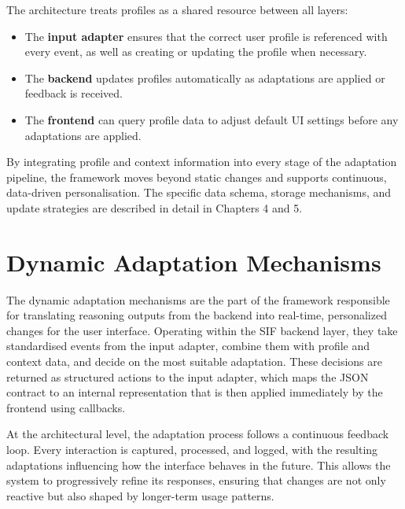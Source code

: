 The architecture treats profiles as a shared resource between all layers:
\begin{itemize}
    \item The \textbf{input adapter} ensures that the correct user profile is referenced with every event, as well as creating or updating the profile when necessary.
    \item The \textbf{backend} updates profiles automatically as adaptations are applied or feedback is received.
    \item The \textbf{frontend} can query profile data to adjust default UI settings before any adaptations are applied.
\end{itemize}
By integrating profile and context information into every stage of the adaptation pipeline, the framework moves beyond static changes and supports continuous, data-driven personalisation. The specific data schema, storage mechanisms, and update strategies are described in detail in Chapters 4 and 5.

\section{Dynamic Adaptation Mechanisms}
The dynamic adaptation mechanisms are the part of the framework responsible for translating reasoning outputs from the backend into real-time, personalized changes for the user interface. Operating within the SIF backend layer, they take standardised events from the input adapter, combine them with profile and context data, and decide on the most suitable adaptation. These decisions are returned as structured actions to the input adapter, which maps the JSON contract to an internal representation that is then applied immediately by the frontend using callbacks.

At the architectural level, the adaptation process follows a continuous feedback loop. Every interaction is captured, processed, and logged, with the resulting adaptations influencing how the interface behaves in the future. This allows the system to progressively refine its responses, ensuring that changes are not only reactive but also shaped by longer-term usage patterns.

